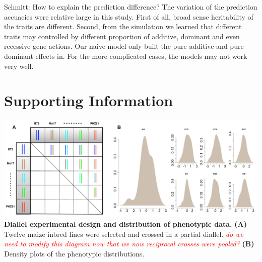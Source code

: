 \documentclass[9pt,twocolumn,twoside]{gsajnl}
\newcommand{\beginsupplement}{%
        \setcounter{table}{0}
        \renewcommand{\thetable}{S\arabic{table}}%
        \setcounter{figure}{0}
        \renewcommand{\thefigure}{S\arabic{figure}}%
     }
\newcommand{\jri}[1]{\textcolor{red}{ \emph{ #1}} }
\begin{document}
Schmitt: How to explain the prediction difference?  
The variation of the prediction accuacies were relative large in this study. First of all, broad sense heritability of the traits are different. Second, from the simulation we learned that different traits may controlled by different proportion of additive, dominant and even recessive gene actions. Our naive model only built the pure additive and pure dominant effects in. For the more complicated cases, the models may not work very well.

\clearpage



\pagebreak
\beginsupplement
\section*{Supporting Information}

\onecolumn
\begin{center}\vspace{1cm}
\includegraphics[width=0.8\linewidth]{SFig_pvp.pdf}
{\color{black} \textbf{Diallel experimental design and distribution of phenotypic data.}
\textbf{(A)} Twelve maize inbred lines were selected and crossed in a partial diallel. \jri{do we need to modify this diagram now that we now reciprocal crosses were pooled?} \textbf{(B)} Density plots of the phenotypic distributions.
}
\label{fig:pvp-pheno}
\end{center}\vspace{1cm}
\end{document}
